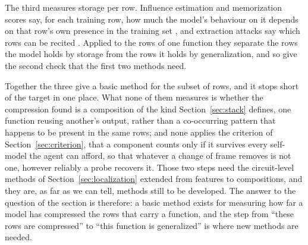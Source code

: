 The third measures storage per row. Influence estimation and memorization scores say, for each
training row, how much the model's behaviour on it depends on that row's own presence in the training
set \citep{feldman2020}, and extraction attacks say which rows can be recited \citep{carlini2023}.
Applied to the rows of one function they separate the rows the model holds by storage from the rows it
holds by generalization, and so give the second check that the first two methods need.

Together the three give a basic method for the subset of rows, and it stops short of the target in one
place. What none of them measures is whether the compression found is a composition of the kind
Section~\ref{sec:stack} defines, one function reusing another's output, rather than a co-occurring
pattern that happens to be present in the same rows; and none applies the criterion of
Section~\ref{sec:criterion}, that a component counts only if it survives every self-model the agent can
afford, so that whatever a change of frame removes is not one, however reliably a probe recovers it.
Those two steps need the circuit-level methods of Section~\ref{sec:localization} extended from
features to compositions, and they are, as far as we can tell, methods still to be developed. The
answer to the question of the section is therefore: a basic method exists for measuring how far a
model has compressed the rows that carry a function, and the step from ``these rows are compressed''
to ``this function is generalized'' is where new methods are needed.

